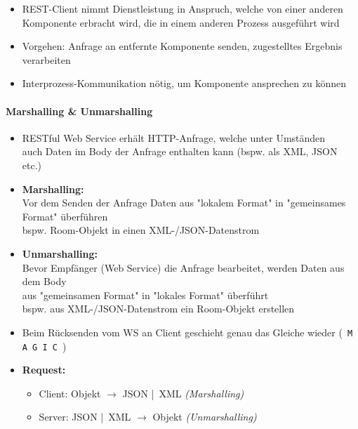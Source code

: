 \documentclass[a4paper]{article}
\begin{document}
		\begin{itemize}
			\item REST-Client nimmt Dienstleistung in Anspruch, welche von einer anderen Komponente erbracht wird, die in einem anderen Prozess ausgeführt wird
			\item Vorgehen: Anfrage an entfernte Komponente senden, zugestelltes Ergebnis verarbeiten
			\item Interprozess-Kommunikation nötig, um Komponente ansprechen zu können
		\end{itemize}
	
			\paragraph{Marshalling \& Unmarshalling}
			
				\begin{itemize}
					\item RESTful Web Service erhält HTTP-Anfrage, welche unter Umständen\\
					auch Daten im Body der Anfrage enthalten kann (bspw. als XML, JSON etc.)
					
					\item \textbf{Marshalling:}\\
					Vor dem Senden der Anfrage Daten aus "lokalem Format" in "gemeinsames Format" überführen\\
					bspw. Room-Objekt in einen XML-/JSON-Datenstrom
					
					\item \textbf{Unmarshalling:}\\
					Bevor Empfänger (Web Service) die Anfrage bearbeitet, werden Daten aus dem Body\\
					aus "gemeinsamen Format" in "lokales Format" überführt\\
					bspw. aus XML-/JSON-Datenstrom ein Room-Objekt erstellen
					
					\item Beim Rücksenden vom WS an Client geschieht genau das Gleiche wieder (\texttt{ M A G I C })\\
					
					
					\item \textbf{Request:}
						\begin{itemize}
							\item Client: Objekt \qquad $\rightarrow$ JSON | XML \textit{(Marshalling)}
							\item Server: JSON | XML $\rightarrow$ Objekt \textit{(Unmarshalling)}
						\end{itemize}
					

\end{itemize}
\end{document}
